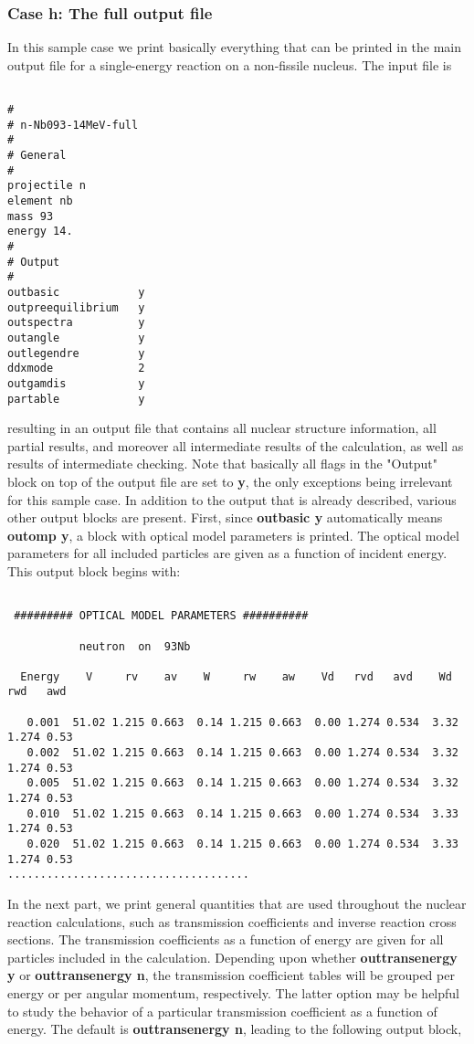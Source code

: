 \begin{samplecase}
\subsubsection{Case h: The full output file}    
In this sample case we print basically everything that can be printed in the
main output file for a single-energy reaction on a non-fissile nucleus. 
The input file is

{\small \begin{verbatim}

#
# n-Nb093-14MeV-full
#
# General
#
projectile n
element nb
mass 93
energy 14.
#
# Output
#
outbasic            y
outpreequilibrium   y
outspectra          y
outangle            y     
outlegendre         y     
ddxmode             2
outgamdis           y
partable            y    
\end{verbatim} } \renewcommand{\baselinestretch}{1.07}\small\normalsize
\noindent
resulting in an output file that contains all nuclear structure information, 
all partial results, and moreover all intermediate results of the 
calculation, as well as results of intermediate checking. Note that basically
all flags in the "Output" block on top of the output file are set to {\bf y},
the only exceptions being irrelevant for this sample case.
In addition to the 
output that is already described, various other output blocks are present.
First, since {\bf outbasic y} automatically means {\bf outomp y}, a block with 
optical model parameters is printed.
The optical model parameters for all
included particles are given as a function of incident energy.
This output block begins with:

{\small \begin{verbatim}

 ######### OPTICAL MODEL PARAMETERS ##########
 
           neutron  on  93Nb
 
  Energy    V     rv    av    W     rw    aw    Vd   rvd   avd    Wd   rwd   awd

   0.001  51.02 1.215 0.663  0.14 1.215 0.663  0.00 1.274 0.534  3.32 1.274 0.53
   0.002  51.02 1.215 0.663  0.14 1.215 0.663  0.00 1.274 0.534  3.32 1.274 0.53
   0.005  51.02 1.215 0.663  0.14 1.215 0.663  0.00 1.274 0.534  3.32 1.274 0.53
   0.010  51.02 1.215 0.663  0.14 1.215 0.663  0.00 1.274 0.534  3.33 1.274 0.53
   0.020  51.02 1.215 0.663  0.14 1.215 0.663  0.00 1.274 0.534  3.33 1.274 0.53
.....................................
\end{verbatim} } \renewcommand{\baselinestretch}{1.07}\small\normalsize
\noindent
In the next part, we print general quantities that are used throughout the 
nuclear reaction calculations, such as transmission coefficients and inverse 
reaction cross sections.
The transmission coefficients as
a function of energy are given for all particles included in the calculation.
Depending upon whether {\bf outtransenergy y} or {\bf outtransenergy n}, the 
transmission coefficient tables will be grouped per energy or per angular 
momentum, respectively. The latter option may be helpful to study the behavior 
of a particular transmission coefficient as a function of energy.
The default is {\bf outtransenergy n}, leading to the following output block,


\end{samplecase}
